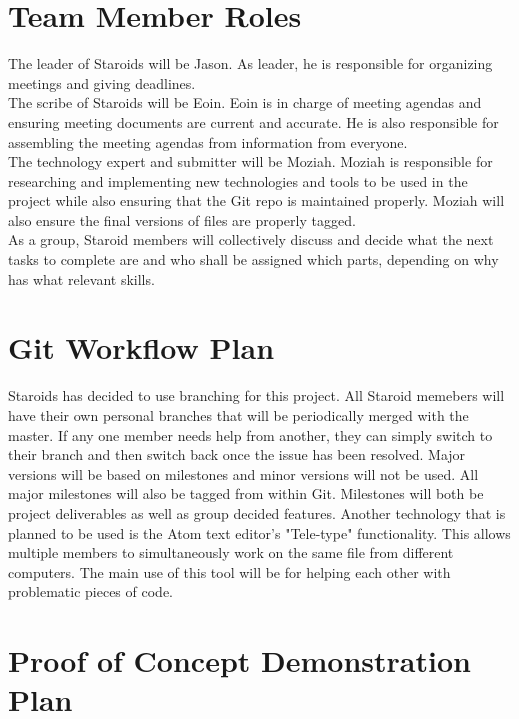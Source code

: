 \documentclass{article}
\begin{document}
\section{Team Member Roles}
The leader of Staroids will be Jason. As leader, he is responsible for organizing meetings and giving deadlines.\\
The scribe of Staroids will be Eoin. Eoin is in charge of meeting agendas and ensuring meeting documents are current and accurate. He is also responsible for assembling the meeting agendas from information from everyone.\\
The technology expert and submitter will be Moziah. Moziah is responsible for researching and implementing new technologies and tools to be used in the project while also ensuring that the Git repo is maintained properly. Moziah will also ensure the final versions of files are properly tagged.\\
As a group, Staroid members will collectively discuss and decide what the next tasks to complete are and who shall be assigned which parts, depending on why has what relevant skills.

\section{Git Workflow Plan}
Staroids has decided to use branching for this project. All Staroid memebers will have their own personal branches that will be periodically merged with the master. If any one member needs help from another, they can simply switch to their branch and then switch back once the issue has been resolved. Major versions will be based on milestones and minor versions will not be used. All major milestones will also be tagged from within Git. Milestones will both be project deliverables as well as group decided features. Another technology that is planned to be used is the Atom text editor's "Tele-type" functionality. This allows multiple members to simultaneously work on the same file from different computers. The main use of this tool will be for helping each other with problematic pieces of code.\\

\section{Proof of Concept Demonstration Plan}

\end{document}
